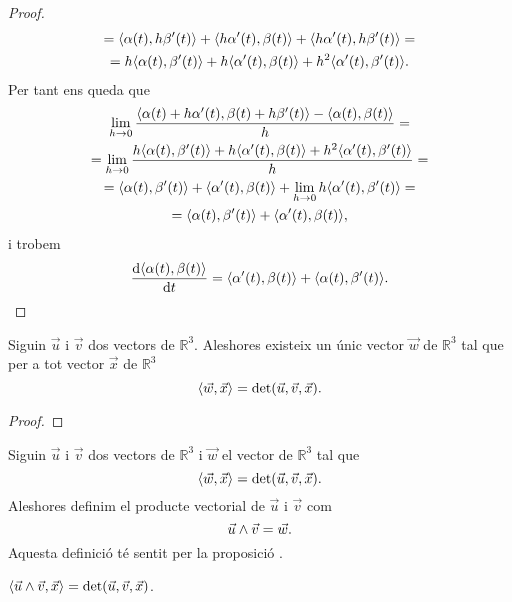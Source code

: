 \documentclass[../../Main.tex]{subfiles}
\begin{document}
\begin{proposition}
\begin{proof}
\begin{multline*}
				=\prodesc{\alpha(t)}{h\beta'(t)}+\prodesc{h\alpha'(t)}{\beta(t)}+\prodesc{h\alpha'(t)}{h\beta'(t)}=\\
				=h\prodesc{\alpha(t)}{\beta'(t)}+h\prodesc{\alpha'(t)}{\beta(t)}+h^{2}\prodesc{\alpha'(t)}{\beta'(t)}.
			\end{multline*}
			Per tant ens queda que
			\begin{multline*}
				\lim_{h\to0}\frac{\prodesc{\alpha(t)+h\alpha'(t)}{\beta(t)+h\beta'(t)}-\prodesc{\alpha(t)}{\beta(t)}}{h}=\\
				=\lim_{h\to0}\frac{h\prodesc{\alpha(t)}{\beta'(t)}+h\prodesc{\alpha'(t)}{\beta(t)}+h^{2}\prodesc{\alpha'(t)}{\beta'(t)}}{h}=\\
				=\prodesc{\alpha(t)}{\beta'(t)}+\prodesc{\alpha'(t)}{\beta(t)}+\lim_{h\to0}h\prodesc{\alpha'(t)}{\beta'(t)}=\\
				=\prodesc{\alpha(t)}{\beta'(t)}+\prodesc{\alpha'(t)}{\beta(t)},
			\end{multline*}
			i trobem
			\[
			    \frac{\diff\prodesc{\alpha(t)}{\beta(t)}}{\diff t}=\prodesc{\alpha'(t)}{\beta(t)}+\prodesc{\alpha(t)}{\beta'(t)}.\qedhere
			\]
		\end{proof}
	\end{proposition}
	\begin{proposition}
		\label{prop:unicitat del producte vectorial entre dos vectors}
		Siguin \(\vec{u}\) i \(\vec{v}\) dos vectors de \(\mathbb{R}^{3}\). Aleshores existeix un únic vector \(\vec{w}\) de \(\mathbb{R}^{3}\) tal que per a tot vector \(\vec{x}\) de \(\mathbb{R}^{3}\)
		\[
		    \prodesc{\vec{w}}{\vec{x}}=\det(\vec{u},\vec{v},\vec{x}).
		\]
		\begin{proof}
		\end{proof}
	\end{proposition}
	\begin{definition}
		\label{def:producte vectorial}
		Siguin \(\vec{u}\) i \(\vec{v}\) dos vectors de \(\mathbb{R}^{3}\) i \(\vec{w}\) el vector de \(\mathbb{R}^{3}\) tal que
		\[
		    \prodesc{\vec{w}}{\vec{x}}=\det(\vec{u},\vec{v},\vec{x}).
		\]
		Aleshores definim el producte vectorial de \(\vec{u}\) i \(\vec{v}\) com
		\[
		    \vec{u}\mathbin{\wedge}\vec{v}=\vec{w}.
		\]
		Aquesta definició té sentit per la proposició .
	\end{definition}
	\begin{observation}
		\label{obs:fórmula del determinant segons el producte vectorial i el producte escalar}
		\(\prodesc{\vec{u}\prodvec\vec{v}}{\vec{x}}=\det(\vec{u},\vec{v},\vec{x})\).
	\end{observation}
\end{document}
